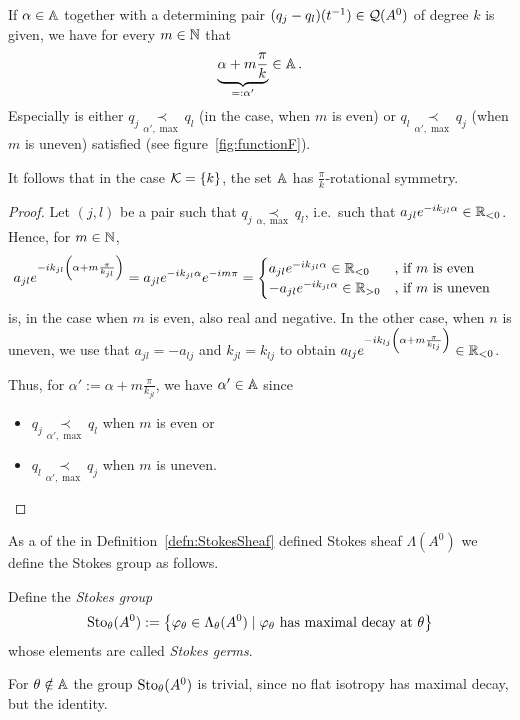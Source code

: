 \begin{lem}\label{lem:rotationalSym}%
  If $\alpha\in\mathbb{A}$ together with a determining pair
  $(q_j-q_l)(t^{-1})\in\mathcal{Q}(A^0)$ of degree $k$ is given, we have for every
  $m\in\mathbb{N}$ that
  \[
    \underset{=:\alpha'}{\underbrace{\alpha+m\frac{\pi}{k}}} \in \mathbb{A} \,.
  \]
  Especially is either $q_j \underset{\alpha',\max}{\prec} q_l$ (in the
  case, when $m$ is even) or $q_l \underset{\alpha',\max}{\prec} q_j$
  (when $m$ is uneven) satisfied (see figure~\ref{fig:functionF}).
  \begin{s-cor}
    It follows that in the case $\mathcal{K}=\{k\}$, the set $\mathbb{A}$ has
    $\frac{\pi}{k}$-rotational symmetry.
  \end{s-cor}
\end{lem}
\begin{proof}
  Let $(j,l)$ be a pair such that
  $q_j \underset{\alpha,\max}{\prec} q_l$, i.e.\ such that
  $a_{jl}e^{-ik_{jl}\alpha}\in\mathbb{R}_{<0}$.
  Hence, for $m\in\mathbb{N}$,
  \begin{align*}
    a_{jl}e^{-ik_{jl}\left(\alpha+m\frac{\pi}{k_{jl}}\right)}
    &=a_{jl}e^{-ik_{jl}\alpha}e^{-im\pi}
    = \begin{cases}
      a_{jl}e^{-ik_{jl}\alpha}\in\mathbb{R}_{<0}
        & \text{, if $m$ is even}
    \\-a_{jl}e^{-ik_{jl}\alpha}\in\mathbb{R}_{>0}
        & \text{, if $m$ is uneven}
    \end{cases}
  \end{align*}
  is, in the case when $m$ is even, also real and negative. In the other
  case, when $n$ is uneven, we use that $a_{jl}=-a_{lj}$ and $k_{jl}=k_{lj}$ to
  obtain
  $a_{lj}e^{-ik_{lj}\left(\alpha+m\frac{\pi}{k_{lj}}\right)} \in\mathbb{R}_{<0}$.

  Thus, for $\alpha':=\alpha+m\frac{\pi}{k_{jl}}$, we have $\alpha'\in\mathbb{A}$ since
  \begin{itemize}
    \item $q_j \underset{\alpha',\max}{\prec} q_l$ when $m$ is even or
    \item $q_l \underset{\alpha',\max}{\prec} q_j$ when $m$ is uneven.
  \end{itemize}
\end{proof}

As a  of the in
Definition~\ref{defn:StokesSheaf} defined Stokes sheaf $\Lambda(A^0)$ we
define the Stokes group as follows.
\begin{defn}\label{defn:stokesGroup}
  Define the \emph{Stokes group}
  \[
    \operatorname{Sto}_\theta(A^0):=
    \left\{\varphi_\theta\in\Lambda_\theta(A^0)
      \mid \varphi_\theta \text{~has maximal decay at~} \theta
    \right\}
  \]
  whose elements are called \emph{Stokes germs}.
  \begin{s-rem}
    For $\theta\notin\mathbb{A}$ the group $\operatorname{Sto}_\theta(A^0)$ is trivial, since no flat
    isotropy has maximal decay, but the identity.

  \end{s-rem}
\end{defn}

